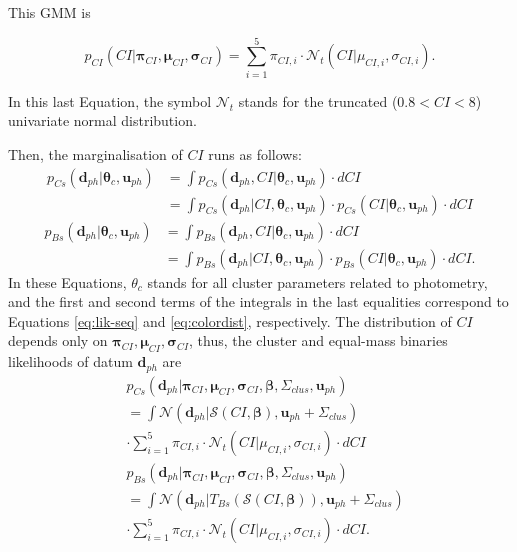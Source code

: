  This GMM is 

\begin{equation}
\label{eq:colordist}
p_{CI}(CI|\boldsymbol{\pi}_{CI},\boldsymbol{\mu}_{CI},\boldsymbol{\sigma}_{CI})= \sum_{i=1}^5 \pi_{CI,i} \cdot \mathcal{N}_t(CI| \mu_{CI,i},\sigma_{CI,i}).
\end{equation}

In this last Equation, the symbol $\mathcal{N}_t$ stands for the truncated ($0.8<CI<8$) univariate normal distribution.

Then, the marginalisation of $CI$ runs as follows:
\begin{align}
\label{eq:clmarginalps}
 p_{Cs}(\mathbf{d}_{ph}| \boldsymbol{\theta}_c,\mathbf{u}_{ph})&=\int p_{Cs}(\mathbf{d}_{ph},CI| \boldsymbol{\theta}_c,\mathbf{u}_{ph}) \cdot dCI \nonumber \\
 &=\int p_{Cs}(\mathbf{d}_{ph}|CI, \boldsymbol{\theta}_c,\mathbf{u}_{ph}) \cdot p_{Cs}(CI| \boldsymbol{\theta}_c,\mathbf{u}_{ph})\cdot dCI 
\end{align}
\begin{align}
\label{eq:clmarginalpb}
p_{Bs}(\mathbf{d}_{ph}| \boldsymbol{\theta}_c,\mathbf{u}_{ph})&=\int p_{Bs}(\mathbf{d}_{ph},CI| \boldsymbol{\theta}_c,\mathbf{u}_{ph})\cdot dCI \nonumber \\
 &=\int p_{Bs}(\mathbf{d}_{ph}|CI, \boldsymbol{\theta}_c,\mathbf{u}_{ph})\cdot p_{Bs}(CI| \boldsymbol{\theta}_c,\mathbf{u}_{ph})\cdot dCI.
\end{align}
In these Equations, $\theta_c$ stands for all cluster parameters related to photometry, and the first and second terms of the integrals in the last equalities correspond to Equations \ref{eq:lik-seq} and \ref{eq:colordist}, respectively. The distribution of $CI$ depends only on $\boldsymbol{\pi}_{CI},\boldsymbol{\mu}_{CI},\boldsymbol{\sigma}_{CI}$, thus, the cluster and equal-mass binaries likelihoods of datum $\mathbf{d}_{ph}$ are 
\begin{align}
\label{eq:lik-seq2}
 &p_{Cs}(\mathbf{d}_{ph}|\boldsymbol{\pi}_{CI},\boldsymbol{\mu}_{CI},\boldsymbol{\sigma}_{CI},\boldsymbol{\beta},\Sigma_{clus},\mathbf{u}_{ph}) \nonumber \\
 &=\int{\mathcal{N}}(\mathbf{d}_{ph}|\boldsymbol{\mathcal{S}}(CI, \boldsymbol{\beta}), \mathbf{u}_{ph}+\Sigma_{clus}) \nonumber \\
 &\cdot \sum_{i=1}^5 \pi_{CI,i}\cdot \mathcal{N}_t(CI| \mu_{CI,i},\sigma_{CI,i}) \cdot dCI\nonumber \\
&p_{Bs}(\mathbf{d}_{ph}|\boldsymbol{\pi}_{CI},\boldsymbol{\mu}_{CI},\boldsymbol{\sigma}_{CI}, \boldsymbol{\beta},\Sigma_{clus}, \mathbf{u}_{ph})\nonumber \\
&=\int{\mathcal{N}}(\mathbf{d}_{ph}|T_{Bs}( \boldsymbol{\mathcal{S}}(CI, \boldsymbol{\beta})), \mathbf{u}_{ph}+\Sigma_{clus}) \nonumber \\ &\cdot \sum_{i=1}^5 \pi_{CI,i}\cdot \mathcal{N}_t(CI| \mu_{CI,i},\sigma_{CI,i}) \cdot dCI.
\end{align}

